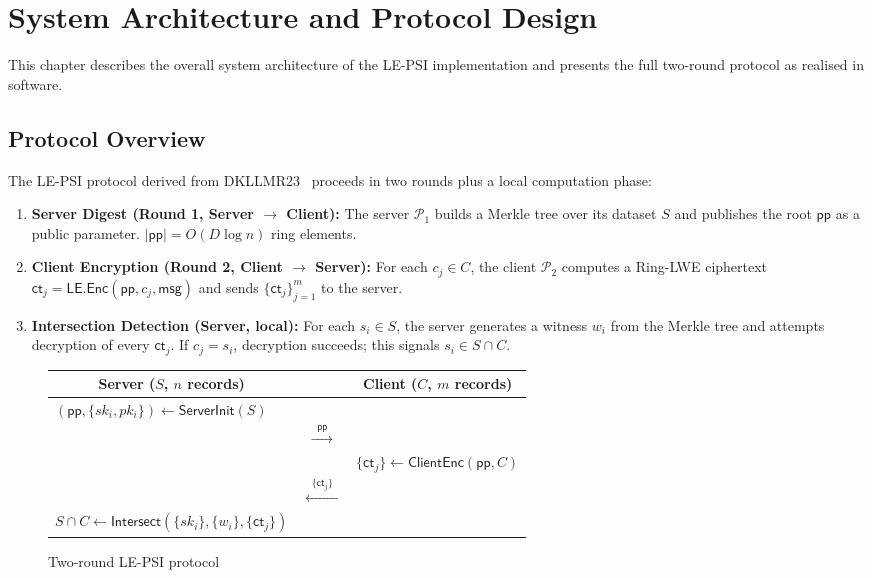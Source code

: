\chapter{System Architecture and Protocol Design}

This chapter describes the overall system architecture of the LE-PSI implementation
and presents the full two-round protocol as realised in software.

\section{Protocol Overview}

The LE-PSI protocol derived from DKLLMR23~\cite{dottling2023efficient} proceeds in
two rounds plus a local computation phase:

\begin{enumerate}
    \item \textbf{Server Digest (Round 1, Server $\to$ Client):}
          The server $\mathcal{P}_1$ builds a Merkle tree over its dataset $S$ and
          publishes the root $\mathsf{pp}$ as a public parameter.
          $|\mathsf{pp}| = O(D \log n)$ ring elements.
    \item \textbf{Client Encryption (Round 2, Client $\to$ Server):}
          For each $c_j \in C$, the client $\mathcal{P}_2$ computes a Ring-LWE
          ciphertext $\mathsf{ct}_j = \mathsf{LE.Enc}(\mathsf{pp}, c_j, \mathsf{msg})$
          and sends $\{\mathsf{ct}_j\}_{j=1}^{m}$ to the server.
    \item \textbf{Intersection Detection (Server, local):}
          For each $s_i \in S$, the server generates a witness $w_i$ from the
          Merkle tree and attempts decryption of every $\mathsf{ct}_j$. If
          $c_j = s_i$, decryption succeeds; this signals $s_i \in S \cap C$.
\end{enumerate}

\begin{figure}[H]
\centering
\renewcommand{\arraystretch}{1.3}
\begin{tabular}{p{5.5cm} c p{5.5cm}}
\hline
\multicolumn{1}{c}{\textbf{Server} ($S$, $n$ records)} & &
\multicolumn{1}{c}{\textbf{Client} ($C$, $m$ records)} \\
\hline
\vspace{2mm}
$(\mathsf{pp}, \{sk_i, pk_i\}) \leftarrow \mathsf{ServerInit}(S)$ & & \\
& $\xrightarrow{\;\;\mathsf{pp}\;\;}$ & \\
& &
$\{\mathsf{ct}_j\} \leftarrow \mathsf{ClientEnc}(\mathsf{pp}, C)$ \\
& $\xleftarrow{\;\;\{\mathsf{ct}_j\}\;\;}$ & \\
$S \cap C \leftarrow \mathsf{Intersect}(\{sk_i\},\{w_i\},\{\mathsf{ct}_j\})$ & & \\
\hline
\end{tabular}
\caption{Two-round LE-PSI protocol}
\label{fig:protocol}
\end{figure}

